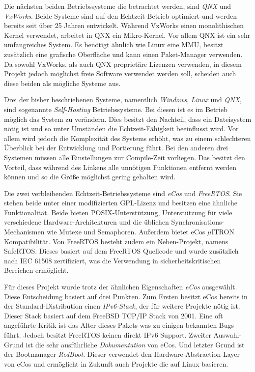\documentclass[
  a4paper,					%
  twoside,
  DIV=calc,     				%
  bibliography=totoc,
  cleardoublepage=empty,
  ngerman,     					%
  final       					%
]{scrbook}
\begin{document}
Die nächsten beiden Betriebssysteme die betrachtet werden, sind \emph{QNX} und \emph{VxWorks}. Beide Systeme sind auf den Echtzeit-Betrieb optimiert und werden bereits seit über 25 Jahren entwickelt. Während VxWorks einen monolithischen Kernel verwendet, arbeitet in QNX ein Mikro-Kernel. Vor allem QNX ist ein sehr umfangreiches System. Es benötigt ähnlich wie Linux eine MMU, besitzt zusätzlich eine grafische Oberfläche und kann einen Paket-Manager verwenden. Da sowohl VxWorks, als auch QNX proprietäre Lizenzen verwenden, in diesem Projekt jedoch möglichst freie Software verwendet werden soll, scheiden auch diese beiden als mögliche Systeme aus.

Drei der bisher beschriebenen Systeme, namentlich \emph{Windows}, \emph{Linux} und \emph{QNX}, sind sogenannte \emph{Self-Hosting} Betriebssysteme. Bei diesen ist es im Betrieb möglich das System zu verändern. Dies besitzt den Nachteil, dass ein Dateisystem nötig ist und so unter Umständen die Echtzeit-Fähigkeit beeinflusst wird. Vor allem wird jedoch die Komplexität des Systems erhöht, was zu einem schlechteren Überblick bei der Entwicklung und Portierung führt. Bei den anderen drei Systemen müssen alle Einstellungen zur Compile-Zeit vorliegen. Das besitzt den Vorteil, dass während des Linkens alle unnötigen Funktionen entfernt werden können und so die Größe möglichst gering gehalten wird.

Die zwei verbleibenden Echtzeit-Betriebssysteme sind \emph{eCos} und \emph{FreeRTOS}. Sie stehen beide unter einer modifizierten GPL-Lizenz und besitzen eine ähnliche Funktionalität. Beide bieten POSIX-Unterstützung, Unterstützung für viele verschiedene Hardware-Architekturen und die üblichen Synchronisations-Mechanismen wie Mutexe und Semaphoren. Außerdem bietet eCos $\mu$ITRON Kompatibilität. Von FreeRTOS besteht zudem ein Neben-Projekt, namens SafeRTOS. Dieses basiert auf dem FreeRTOS Quellcode und wurde zusätzlich nach IEC 61508 zertifiziert, was die Verwendung in sicherheitskritischen Bereichen ermöglicht.

Für dieses Projekt wurde trotz der ähnlichen Eigenschaften \emph{eCos} ausgewählt. Diese Entscheidung basiert auf drei Punkten. Zum Ersten besitzt eCos bereits in der Standard-Distribution einen \emph{IPv6-Stack}, der für weitere Projekte nötig ist. Dieser Stack basiert auf dem FreeBSD TCP/IP Stack von 2001. Eine oft angeführte Kritik ist das Alter dieses Pakets was zu einigen bekannten Bugs führt. Jedoch besitzt FreeRTOS keinen direkt IPv6 Support. Zweiter Auswahl-Grund ist die sehr ausführliche \emph{Dokumentation} von eCos. Und letzter Grund ist der Bootmanager \emph{RedBoot}. Dieser verwendet den Hardware-Abstraction-Layer von eCos und ermöglicht in Zukunft auch Projekte die auf Linux basieren.
\end{document}
